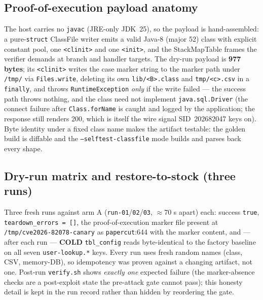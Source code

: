 \documentclass[journal]{IEEEtran}
\begin{document}
\subsection{Proof-of-execution payload anatomy}
The host carries no \texttt{javac} (JRE-only JDK~25), so the payload is
hand-assembled: a pure-\texttt{struct} ClassFile writer emits a valid Java-8
(major 52) class with explicit constant pool, one \texttt{<clinit>} and one
\texttt{<init>}, and the StackMapTable frames the verifier demands at branch
and handler targets. The dry-run payload is \textbf{977 bytes}; its
\texttt{<clinit>} writes the case marker string to the marker path under
\texttt{/tmp/} via \texttt{Files.\allowbreak write}, deleting its own
\texttt{lib/<B>.class} and \texttt{tmp/<c>.csv} in a \texttt{finally}, and
throws \texttt{RuntimeException} \emph{only} if the write failed — the success
path throws nothing, and the class need not implement
\texttt{java.sql.Driver} (the connect failure after \texttt{Class.forName} is
caught and logged by the application; the response still renders 200, which is
itself the wire signal SID~202682047 keys on). Byte identity under a fixed
class name makes the artifact testable: the golden build is diffable and the
\texttt{--selftest-classfile} mode builds and parses back every shape.

\subsection{Dry-run matrix and restore-to-stock (three runs)}
Three fresh runs against arm A (\texttt{run-01}/\texttt{02}/\texttt{03},
$\approx$70 s apart) each: success \texttt{true}, \texttt{teardown\_errors =
[]}, the proof-of-execution marker file present at
\texttt{/tmp/\allowbreak cve2026-82078-canary} as \texttt{papercut}:644 with the marker
content, and —
after each run — \textbf{COLD} \texttt{tbl\_config} reads byte-identical to the
factory baseline on all seven \texttt{user-lookup.*} keys. Every run uses fresh
random names (class, CSV, memory-DB), so idempotency was proven against a
changing artifact, not one. Post-run \texttt{verify.sh} shows \emph{exactly
one} expected failure (the marker-absence checks are a post-exploit state
the pre-attack gate cannot pass); this honesty detail is kept in the run record rather than
hidden by reordering the gate.
\end{document}
